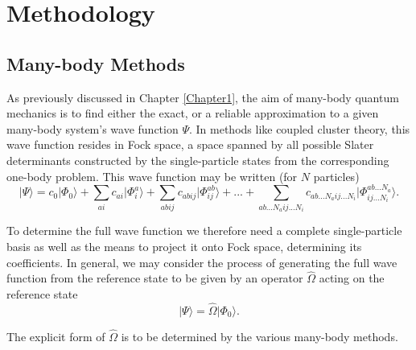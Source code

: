 
\chapter{Methodology} %

\label{Chapter4} %



\section{Many-body Methods}

As previously discussed in Chapter \ref{Chapter1}, the aim of many-body quantum mechanics 
is to find either the exact, or a reliable
approximation to a given many-body system's wave function $\Psi$. In methods like coupled cluster theory, this wave
function resides in Fock space, a space spanned by all possible Slater
determinants constructed by the single-particle states from the
corresponding one-body problem. This wave function may be written (for
$N$ particles)
\begin{equation}
\vert \Psi \rangle = c_0 \vert \Phi_0 \rangle + \sum_{ai} c_{ai }\vert \Phi_i^a \rangle +  \sum_{abij} c_{abij} \vert \Phi_{ij}^{ab} \rangle + ... + \sum_{ab...N_a ij...N_i} c_{ab...N_a ij...N_i} \vert \Phi_{ij...N_i}^{ab...N_a} \rangle.
\label{eqn:fullCI}
\end{equation}

To determine the full wave function we therefore need a complete
single-particle basis as well as the means to project it onto Fock
space, determining its coefficients. In general, we may consider the
process of generating the full wave function from the reference state
to be given by an  operator $\hat{\Omega}$ acting on the reference state
\begin{equation}
\vert \Psi \rangle = \hat{\Omega} \vert \Phi_0 \rangle .
\label{eqn:reference_operator}
\end{equation}

The explicit form of $\hat{\Omega}$ is to be determined by the various many-body methods. 


